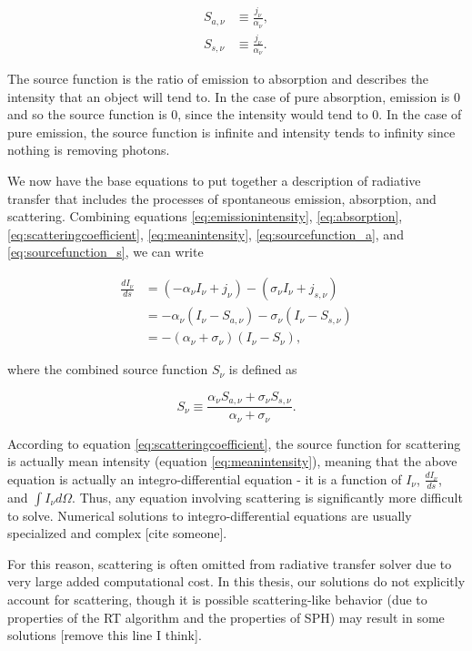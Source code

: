 \begin{align}
S_{a,\nu} &\equiv \frac{j_{\nu}}{\alpha_{\nu}}, \label{eq:sourcefunction_a}\\
S_{s,\nu} &\equiv \frac{j_{\nu}}{\alpha_{\nu}}. \label{eq:sourcefunction_s}
\end{align}

The source function is the ratio of emission to absorption and describes the intensity that an object will tend to. In the case of pure absorption, emission is 0 and so the source function is 0, since the intensity would tend to 0. In the case of pure emission, the source function is infinite and intensity tends to infinity since nothing is removing photons.

We now have the base equations to put together a description of radiative transfer that includes the processes of spontaneous emission, absorption, and scattering. Combining equations \ref{eq:emissionintensity}, \ref{eq:absorption}, \ref{eq:scatteringcoefficient}, \ref{eq:meanintensity}, \ref{eq:sourcefunction_a}, and \ref{eq:sourcefunction_s}, we can write

\begin{align}
\label{eq:combinedtransfer}
\frac{dI_{\nu}}{ds} &= (-\alpha_{\nu}I_{\nu} + j_{\nu}) - (\sigma_{\nu}I_{\nu} + j_{s,\nu}) \nonumber\\
 &= -\alpha_{\nu}(I_{\nu} - S_{a,\nu}) - \sigma_{\nu}(I_{\nu} - S_{s,\nu}) \nonumber\\
 &= -(\alpha_{\nu} + \sigma_{\nu})(I_{\nu}-S_{\nu}),
\end{align}

where the combined source function $S_{\nu}$ is defined as

\begin{equation}
\label{eq:combinedsourcefunction}
S_{\nu} \equiv \frac{\alpha_{\nu}S_{a,\nu} + \sigma_{\nu}S_{s,\nu}}{\alpha_{\nu} + \sigma_{\nu}}.
\end{equation}

According to equation \ref{eq:scatteringcoefficient}, the source function for scattering is actually mean intensity (equation \ref{eq:meanintensity}), meaning that the above equation is actually an integro-differential equation - it is a function of $I_{\nu}$, $\frac{dI_{\nu}}{ds}$, and $\int I_{\nu} d\Omega$. Thus, any equation involving scattering is significantly more difficult to solve. Numerical solutions to integro-differential equations are usually specialized and complex [cite someone].

For this reason, scattering is often omitted from radiative transfer solver due to very large added computational cost. In this thesis, our solutions do not explicitly account for scattering, though it is possible scattering-like behavior (due to properties of the RT algorithm and the properties of SPH) may result in some solutions [remove this line I think].

